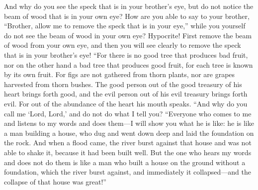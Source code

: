 \begin{biblechapter}
\verse And why do you see the speck that is in your brother’s eye, but do not notice the beam of wood that is in your own eye?
\verse How are you able to say to your brother, “Brother, allow me to remove the speck that is in your eye,” while you yourself do not see the beam of wood in your own eye? Hypocrite! First remove the beam of wood from your own eye, and then you will see clearly to remove the speck that is in your brother’s eye!
 “For there is no good tree that produces bad fruit, nor on the other hand a bad tree that produces good fruit,
\verse for each tree is known by its own fruit. For figs are not gathered from thorn plants, nor are grapes harvested from thorn bushes.
\verse The good person out of the good treasury of his heart brings forth good, and the evil person out of his evil treasury brings forth evil. For out of the abundance of the heart his mouth speaks.
\verse “And why do you call me ‘Lord, Lord,’ and do not do what I tell you?
 “Everyone who comes to me and listens to my words and does them—I will show you what he is like:
\verse he is like a man building a house, who dug and went down deep and laid the foundation on the rock. And when a flood came, the river burst against that house and was not able to shake it, because it had been built well.
\verse But the one who hears my words and does not do them is like a man who built a house on the ground without a foundation, which the river burst against, and immediately it collapsed—and the collapse of that house was great!”
\end{biblechapter}

